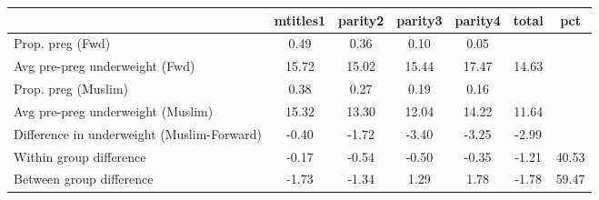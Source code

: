 \begin{tabular}{l*{6}{c}}
\toprule
            &\multicolumn{1}{c}{mtitles1}&\multicolumn{1}{c}{parity2}&\multicolumn{1}{c}{parity3}&\multicolumn{1}{c}{parity4}&\multicolumn{1}{c}{total}&\multicolumn{1}{c}{pct}\\
\midrule
\midrule
Prop. preg (Fwd)&        0.49&        0.36&        0.10&        0.05&            &            \\
Avg pre-preg underweight (Fwd)&       15.72&       15.02&       15.44&       17.47&       14.63&            \\
Prop. preg (Muslim)&        0.38&        0.27&        0.19&        0.16&            &            \\
Avg pre-preg underweight (Muslim)&       15.32&       13.30&       12.04&       14.22&       11.64&            \\
Difference in underweight (Muslim-Forward)&       -0.40&       -1.72&       -3.40&       -3.25&       -2.99&            \\
Within group difference&       -0.17&       -0.54&       -0.50&       -0.35&       -1.21&       40.53\\
Between group difference&       -1.73&       -1.34&        1.29&        1.78&       -1.78&       59.47\\
\bottomrule
\end{tabular}
